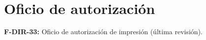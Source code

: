 \section*{Oficio de autorización}

\textbf{F-DIR-33:} Oficio de autorización de impresión (última revisión).

\newpage